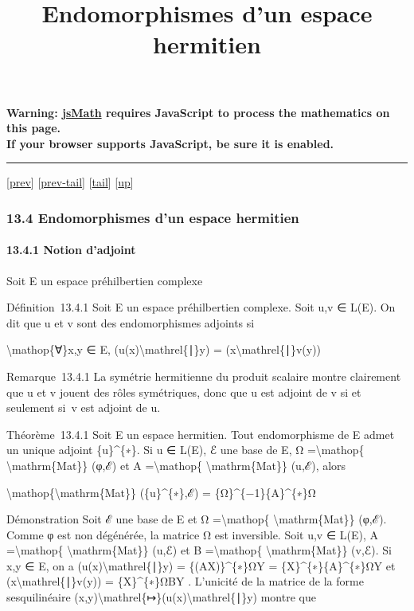 \documentclass[]{article}
\title{Endomorphismes d'un espace hermitien}
\author{}
\date{}
\begin{document}
\maketitle

\textbf{Warning: \href{http://www.math.union.edu/locate/jsMath}{jsMath}
requires JavaScript to process the mathematics on this page.\\ If your
browser supports JavaScript, be sure it is enabled.}

\begin{center}\rule{3in}{0.4pt}\end{center}

{[}\href{coursse75.html}{prev}{]}
{[}\href{coursse75.html\#tailcoursse75.html}{prev-tail}{]}
{[}\hyperref[tailcoursse76.html]{tail}{]}
{[}\href{coursch14.html\#coursse76.html}{up}{]}

\subsubsection{13.4 Endomorphismes d'un espace hermitien}

\paragraph{13.4.1 Notion d'adjoint}

Soit E un espace préhilbertien complexe

Définition~13.4.1 Soit E un espace préhilbertien complexe. Soit u,v ∈
L(E). On dit que u et v sont des endomorphismes adjoints si

\textbackslash{}mathop\{∀\}x,y ∈ E, (u(x)\textbackslash{}mathrel\{∣\}y)
= (x\textbackslash{}mathrel\{∣\}v(y))

Remarque~13.4.1 La symétrie hermitienne du produit scalaire montre
clairement que u et v jouent des rôles symétriques, donc que u est
adjoint de v si et seulement si~v est adjoint de u.

Théorème~13.4.1 Soit E un espace hermitien. Tout endomorphisme de E
admet un unique adjoint \{u\}\^{}\{∗\}. Si u ∈ L(E), ℰ une base de E, Ω
=\textbackslash{}mathop\{ \textbackslash{}mathrm\{Mat\}\} (φ,ℰ) et A
=\textbackslash{}mathop\{ \textbackslash{}mathrm\{Mat\}\} (u,ℰ), alors

\textbackslash{}mathop\{\textbackslash{}mathrm\{Mat\}\}
(\{u\}\^{}\{∗\},ℰ) = \{Ω\}\^{}\{−1\}\{A\}\^{}\{∗\}Ω

Démonstration Soit ℰ une base de E et Ω =\textbackslash{}mathop\{
\textbackslash{}mathrm\{Mat\}\} (φ,ℰ). Comme φ est non dégénérée, la
matrice Ω est inversible. Soit u,v ∈ L(E), A =\textbackslash{}mathop\{
\textbackslash{}mathrm\{Mat\}\} (u,ℰ) et B =\textbackslash{}mathop\{
\textbackslash{}mathrm\{Mat\}\} (v,ℰ). Si x,y ∈ E, on a
(u(x)\textbackslash{}mathrel\{∣\}y) = \{(AX)\}\^{}\{∗\}ΩY =
\{X\}\^{}\{∗\}\{A\}\^{}\{∗\}ΩY et (x\textbackslash{}mathrel\{∣\}v(y)) =
\{X\}\^{}\{∗\}ΩBY . L'unicité de la matrice de la forme sesquilinéaire
(x,y)\textbackslash{}mathrel\{↦\}(u(x)\textbackslash{}mathrel\{∣\}y)
montre que
\end{document}
